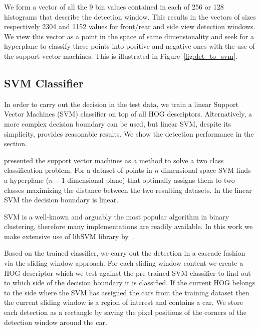 We form a vector of all the 9 bin values contained in each of 256 or 128
histograms that describe the detection window. This results in the vectors of
sizes respectively 2304 and 1152 values for front/rear and side view detection
windows. We view this vector as a point in the space of same dimensionality
and seek for a hyperplane to classify these points into positive and negative
ones with the use of the support vector machines. This is illustrated in
Figure~\ref{fig:det_to_svm}.


\subsection{SVM Classifier}\label{sub:svm_classifier}

In order to carry out the decision in the test data, we train a linear Support
Vector Machines (SVM) classifier on top of all HOG descriptors. Alternatively,
a more complex decision boundary can be used, but linear SVM, despite its
simplicity, provides reasonable results. We show the detection performance in
the  section.

\citet{svm} presented the support vector machines as a method to solve a two
class classification problem. For a dataset of points in $n$ dimensional space
SVM finds a hyperplane ($n-1$ dimensional plane) that optimally assigns them
to two classes maximizing the distance between the two resulting datasets. In
the linear SVM the decision boundary is linear.

SVM is a well-known and arguably the most popular algorithm in binary
clustering, therefore many implementations are readily available. In this work
we make extensive use of libSVM library by~\citet{libSVM2011}.

Based on the trained classifier, we carry out the detection in a cascade
fashion via the sliding window approach. For each sliding window content we
create a HOG descriptor which we test against the pre-trained SVM classifier
to find out to which side of the decision boundary it is classified. If the
current HOG belongs to the side where the SVM has assigned the cars from the
training dataset then the current sliding window is a region of interest and
contains a car. We store each detection as a rectangle by saving the pixel
positions of the corners of the detection window around the car.


